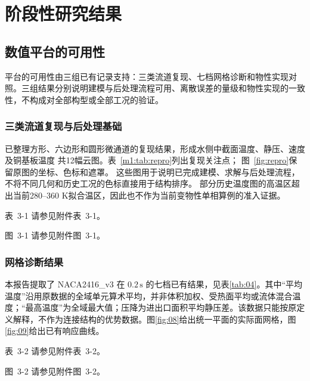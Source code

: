 \documentclass[UTF8]{midterm}
\makeatletter
\newcommand{\submissionnumber}[1]{\def\@currentlabel{#1}}
\makeatother
\begin{document}
\section{阶段性研究结果}

\subsection{数值平台的可用性}
平台的可用性由三组已有记录支持：三类流道复现、七档网格诊断和物性实现对照。三组结果分别说明建模与后处理流程可用、离散误差的量级和物性实现的一致性，不构成对全部构型或全部工况的验证。
\subsubsection{三类流道复现与后处理基础}
已整理方形、六边形和圆形微通道的复现结果，形成水侧中截面温度、静压、速度及铜基板温度
共12幅云图。表~\ref{m1:tab:repro}列出复现关注点；
图~\ref{fig:repro}保留原图的坐标、色标和遮罩。
这些图用于说明已完成建模、求解与后处理流程，不将不同几何和历史工况的色标直接用于结构排序。
部分历史温度图的高温区超出当前280--360 K拟合温区，因此也不作为当前变物性单相算例的准入证据。

\par\noindent \begingroup\submissionnumber{3-1}\label{m1:tab:repro}\endgroup 表~3-1 请参见附件表~3-1。\par


\par\noindent \begingroup\submissionnumber{3-1}\label{fig:repro}\endgroup 图~3-1 请参见附件图~3-1。\par

\subsubsection{网格诊断结果}
本报告提取了 NACA2416\_v3 在 $0.2\,\mathrm{s}$ 的七档已有结果，见表\ref{tab:04}。其中“平均温度”沿用原数据的全域单元算术平均，并非体积加权、受热面平均或流体混合温度；“最高温度”为全域最大值；压降为进出口面积平均静压差。该数据只能按原定义解释，不作为连接结构的优势数据。图\ref{fig:08}给出统一平面的实际面网格，图\ref{fig:09}给出已有响应曲线。

\par\noindent \begingroup\submissionnumber{3-2}\label{tab:04}\endgroup 表~3-2 请参见附件表~3-2。\par




\par\noindent \begingroup\submissionnumber{3-2a}\label{fig:08}\endgroup \begingroup\submissionnumber{3-2b}\label{fig:09}\endgroup 图~3-2 请参见附件图~3-2。\par
\end{document}
